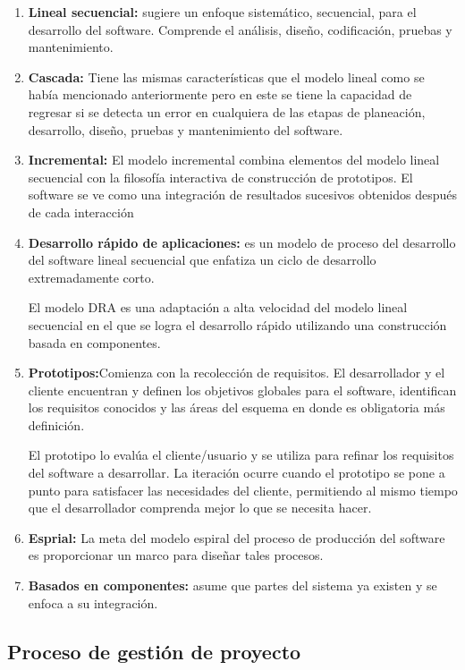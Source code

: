 \documentclass[12pt,twoside]{article}
\begin{document}
\begin{enumerate}
    \item \textbf{Lineal secuencial:} sugiere un enfoque sistemático, secuencial, para el
    desarrollo del software. Comprende el análisis, diseño, codificación, pruebas y mantenimiento.
    \item \textbf{Cascada:} Tiene las mismas características que el modelo lineal como se había 
    mencionado anteriormente pero en este se tiene la capacidad de regresar si se detecta un error 
    en cualquiera de las etapas de planeación, desarrollo, diseño, pruebas y mantenimiento del 
    software.
    \item \textbf{Incremental:} El modelo incremental combina elementos del modelo lineal 
    secuencial con la filosofía interactiva de construcción de prototipos. El software se ve como 
    una integración de resultados sucesivos obtenidos después de cada interacción
    \item \textbf{Desarrollo rápido de aplicaciones:} es un modelo de proceso del
    desarrollo del software lineal secuencial que enfatiza un ciclo de desarrollo
    extremadamente corto.

    El modelo DRA es una adaptación a alta velocidad del modelo lineal secuencial en el que se 
    logra el desarrollo rápido utilizando una construcción basada en componentes.    
    \item \textbf{Prototipos:}Comienza con la recolección de requisitos. El desarrollador y el 
    cliente encuentran y definen los objetivos globales para el software, identifican los 
    requisitos conocidos y las áreas del esquema en donde es obligatoria más definición.

    El prototipo lo evalúa el cliente/usuario y se utiliza para refinar los requisitos del software 
    a desarrollar. La iteración ocurre cuando el prototipo se pone a punto para satisfacer las 
    necesidades del cliente, permitiendo al mismo tiempo que el desarrollador comprenda mejor lo 
    que se necesita hacer.
    \item \textbf{Esprial:} La meta del modelo espiral del proceso de producción del software es proporcionar un marco para
    diseñar tales procesos.
    \item \textbf{Basados en componentes:} asume que partes del sistema ya existen y se enfoca 
    a su integración.
\end{enumerate}


\subsection{Proceso de gesti\'on de proyecto}
\end{document}
